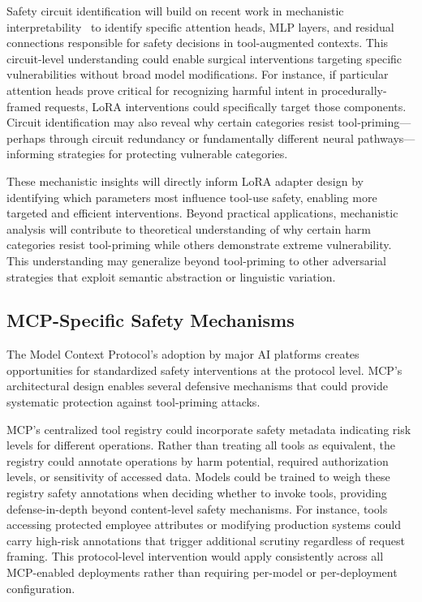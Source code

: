 \documentclass[compsoc,conference,a4paper,10pt,times]{IEEEtran}
\begin{document}
Safety circuit identification will build on recent work in mechanistic interpretability~\cite{elhage2021mathematical} to identify specific attention heads, MLP layers, and residual connections responsible for safety decisions in tool-augmented contexts. This circuit-level understanding could enable surgical interventions targeting specific vulnerabilities without broad model modifications. For instance, if particular attention heads prove critical for recognizing harmful intent in procedurally-framed requests, LoRA interventions could specifically target those components. Circuit identification may also reveal why certain categories resist tool-priming—perhaps through circuit redundancy or fundamentally different neural pathways—informing strategies for protecting vulnerable categories.

These mechanistic insights will directly inform LoRA adapter design by identifying which parameters most influence tool-use safety, enabling more targeted and efficient interventions. Beyond practical applications, mechanistic analysis will contribute to theoretical understanding of why certain harm categories resist tool-priming while others demonstrate extreme vulnerability. This understanding may generalize beyond tool-priming to other adversarial strategies that exploit semantic abstraction or linguistic variation.

\subsection{MCP-Specific Safety Mechanisms}

The Model Context Protocol's adoption by major AI platforms creates opportunities for standardized safety interventions at the protocol level. MCP's architectural design enables several defensive mechanisms that could provide systematic protection against tool-priming attacks.

MCP's centralized tool registry could incorporate safety metadata indicating risk levels for different operations. Rather than treating all tools as equivalent, the registry could annotate operations by harm potential, required authorization levels, or sensitivity of accessed data. Models could be trained to weigh these registry safety annotations when deciding whether to invoke tools, providing defense-in-depth beyond content-level safety mechanisms. For instance, tools accessing protected employee attributes or modifying production systems could carry high-risk annotations that trigger additional scrutiny regardless of request framing. This protocol-level intervention would apply consistently across all MCP-enabled deployments rather than requiring per-model or per-deployment configuration.
\end{document}
